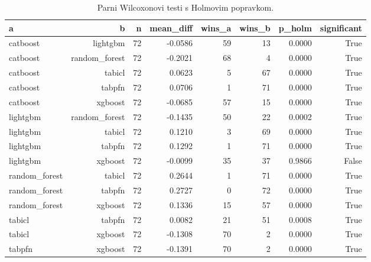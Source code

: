 \begin{table}[htbp]
\centering
\caption{Parni Wilcoxonovi testi s Holmovim popravkom.}
\label{tab:wilcoxon}
\begin{tabular}{lrrrrrrr}
\hline
a & b & n & mean\_diff & wins\_a & wins\_b & p\_holm & significant \\
\hline
catboost & lightgbm & 72 & -0.0586 & 59 & 13 & 0.0000 & True \\
catboost & random\_forest & 72 & -0.2021 & 68 & 4 & 0.0000 & True \\
catboost & tabicl & 72 & 0.0623 & 5 & 67 & 0.0000 & True \\
catboost & tabpfn & 72 & 0.0706 & 1 & 71 & 0.0000 & True \\
catboost & xgboost & 72 & -0.0685 & 57 & 15 & 0.0000 & True \\
lightgbm & random\_forest & 72 & -0.1435 & 50 & 22 & 0.0002 & True \\
lightgbm & tabicl & 72 & 0.1210 & 3 & 69 & 0.0000 & True \\
lightgbm & tabpfn & 72 & 0.1292 & 1 & 71 & 0.0000 & True \\
lightgbm & xgboost & 72 & -0.0099 & 35 & 37 & 0.9866 & False \\
random\_forest & tabicl & 72 & 0.2644 & 1 & 71 & 0.0000 & True \\
random\_forest & tabpfn & 72 & 0.2727 & 0 & 72 & 0.0000 & True \\
random\_forest & xgboost & 72 & 0.1336 & 15 & 57 & 0.0000 & True \\
tabicl & tabpfn & 72 & 0.0082 & 21 & 51 & 0.0008 & True \\
tabicl & xgboost & 72 & -0.1308 & 70 & 2 & 0.0000 & True \\
tabpfn & xgboost & 72 & -0.1391 & 70 & 2 & 0.0000 & True \\
\hline
\end{tabular}
\end{table}
